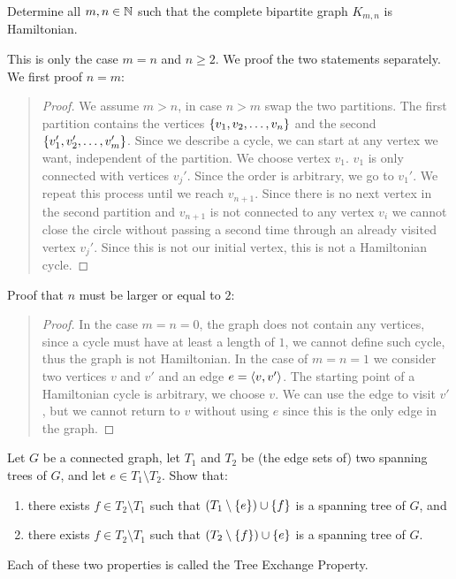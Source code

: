 \documentclass{article}
\begin{document}
\begin{exercise}
Determine all $m,n\in\mathbb{N}$ such that the complete bipartite graph $K_{m,n}$ is Hamiltonian.
\begin{answer}
This is only the case $m=n$ and $n\geq 2$. We proof the two statements separately. We first proof $n=m$:
\begin{quote}\begin{proof}
We assume $m>n$, in case $n>m$ swap the two partitions. The first partition contains the vertices $\left\{ v_1,v_2,\ldots,v_n \right\}$ and the second $\left\{ v_1',v_2',\ldots,v_m' \right\}$. Since we describe a cycle, we can start at any vertex we want, independent of the partition. We choose vertex $v_1$. $v_1$ is only connected with vertices $v_j'$. Since the order is arbitrary, we go to $v_1'$. We repeat this process until we reach $v_{n+1}$. Since there is no next vertex in the second partition and $v_{n+1}$ is not connected to any vertex $v_i$ we cannot close the circle without passing a second time through an already visited vertex $v_j'$. Since this is not our initial vertex, this is not a Hamiltonian cycle.
\end{proof}\end{quote}
Proof that $n$ must be larger or equal to $2$:
\begin{quote}\begin{proof}
In the case $m=n=0$, the graph does not contain any vertices, since a cycle must have at least a length of $1$, we cannot define such cycle, thus the graph is not Hamiltonian. In the case of $m=n=1$ we consider two vertices $v$ and $v'$ and an edge $e=\left\langle v,v' \right\rangle$. The starting point of a Hamiltonian cycle is arbitrary, we choose $v$. We can use the edge to visit $v'$, but we cannot return to $v$ without using $e$ since this is the only edge in the graph.
\end{proof}\end{quote}
\end{answer}
\end{exercise}

\begin{exercise}
Let $G$ be a connected graph, let $T_1$ and $T_2$ be (the edge sets of) two spanning trees of $G$, and let $e\in T_1\setminus T_2$. Show that:
\begin{enumerate}
 \item there exists $f\in T_2\setminus T_1$ such that $\left( T_1\setminus\left\{ e \right\} \right)\cup\left\{ f \right\}$ is a spanning tree of $G$, and
 \item there exists $f\in T_2\setminus T_1$ such that $\left( T_2\setminus\left\{ f \right\} \right)\cup\left\{ e \right\}$ is a spanning tree of $G$.
\end{enumerate}
\begin{note}
Each of these two properties is called the Tree Exchange Property.
\end{note}
\begin{answer}

\end{answer}
\end{exercise}
\end{document}
